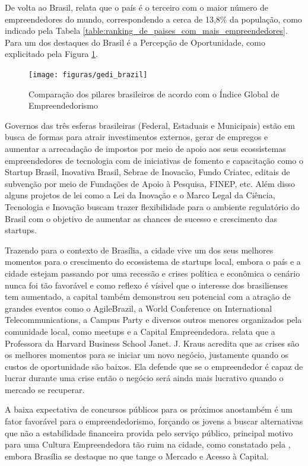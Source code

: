 De volta ao Brasil,  relata que o país é o terceiro com o maior número de empreendedores do mundo, correspondendo a cerca de 13,8\% da população, como indicado pela Tabela \ref{table:ranking_de_paises_com_mais_empreendedores}. Para  um dos destaques do Brasil é a Percepção de Oportunidade, como explicitado pela Figura \ref{figure:gedi_brazil}.

\begin{figure}[!htb]
	\centering
	\texttt{[image: figuras/gedi\_brazil]}
	\caption{Comparação dos pilares brasileiros de acordo com o Índice Global de Empreendedorismo}
	\label{figure:gedi_brazil}
\end{figure}

Governos das três esferas brasileiras (Federal, Estaduais e Municipais) estão em busca de formas para atrair investimentos externos, gerar de empregos e aumentar a arrecadação de impostos por meio de apoio aos seus ecossistemas empreendedores de tecnologia com de iniciativas de fomento e capacitação como o Startup Brasil, Inovativa Brasil, Sebrae de Inovacão, Fundo Criatec, editais de subvenção por meio de Fundações de Apoio à Pesquisa, FINEP, etc. Além disso alguns projetos de lei como a Lei da Inovação e o Marco Legal da Ciência, Tecnologia e Inovação buscam trazer flexibilidade para o ambiente regulatório do Brasil com o objetivo de aumentar as chances de sucesso e crescimento das startups.

Trazendo para o contexto de Brasília, a cidade vive um dos seus melhores momentos para o crescimento do ecossistema de startups local, embora o país e a cidade estejam passando por uma recessão e crises política e econômica o cenário nunca foi tão favorável e como reflexo é vísivel que o interesse dos brasilienses tem aumentado, a capital também demonstrou seu potencial com a atração de grandes eventos como o AgileBrazil, a World Conference on International Telecommunications, a Campus Party e diversos outros menores organizados pela comunidade local, como meetups e a Capital Empreendedora.  relata que a Professora da Harvard Business School Janet. J. Kraus acredita que as crises são os melhores momentos para se iniciar um novo negócio, justamente quando os custos de oportunidade são baixos. Ela defende que se o empreendedor é capaz de lucrar durante uma crise então o negócio será ainda mais lucrativo quando o mercado se recuperar.

A baixa expectativa de concursos públicos para os próximos anostambém é um fator favorável para o empreendedorismo, forçando os jovens a buscar alternativas que não a estabilidade financeira provida pelo serviço público, principal motivo para uma Cultura Empreendedora tão ruim na cidade, como constatado pela , embora Brasília se destaque no que tange o Mercado e Acesso à Capital. 

